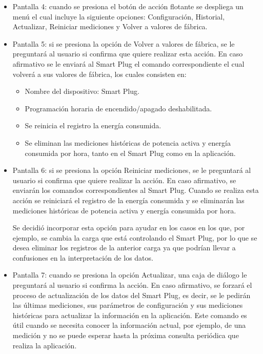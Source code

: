 \begin{itemize}
\item Pantalla 4: cuando se presiona el botón de acción flotante se despliega un menú el cual incluye la siguiente opciones: Configuración, Historial, Actualizar, Reiniciar mediciones y Volver a valores de fábrica.

\item Pantalla 5: si se presiona la opción de Volver a valores de fábrica, se le preguntará al usuario si confirma que quiere realizar esta acción. En caso afirmativo se le enviará al Smart Plug el comando correspondiente el cual volverá a sus valores de fábrica, los cuales consisten en:

\begin{itemize}
\item Nombre del dispositivo: Smart Plug.
\item Programación horaria de encendido/apagado deshabilitada.
\item Se reinicia el registro la energía consumida.
\item Se eliminan las mediciones históricas de potencia activa y energía consumida por hora, tanto en el Smart Plug como en la aplicación.
\end{itemize}

\item Pantalla 6: si se presiona la opción Reiniciar mediciones, se le preguntará al usuario si confirma que quiere realizar la acción. En caso afirmativo, se enviarán los comandos correspondientes al Smart Plug. Cuando se realiza esta acción se reiniciará el registro de la energía consumida y se eliminarán las mediciones históricas de potencia activa y energía consumida por hora. 

Se decidió incorporar esta opción para ayudar en los casos en los que, por ejemplo, se cambia la carga que está controlando el Smart Plug, por lo que se desea eliminar los registros de la anterior carga ya que podrían llevar a confusiones en la interpretación de los datos.

\item Pantalla 7: cuando se presiona la opción Actualizar, una caja de diálogo le preguntará al usuario si confirma la acción. En caso afirmativo, se forzará el proceso de actualización de los datos del Smart Plug, es decir, se le pedirán las últimas mediciones, sus parámetros de configuración y sus mediciones históricas para actualizar la información en la aplicación. Este comando es útil cuando se necesita conocer la información actual, por ejemplo, de una medición y no se puede esperar hasta la próxima consulta periódica que realiza la aplicación.


\end{itemize}
